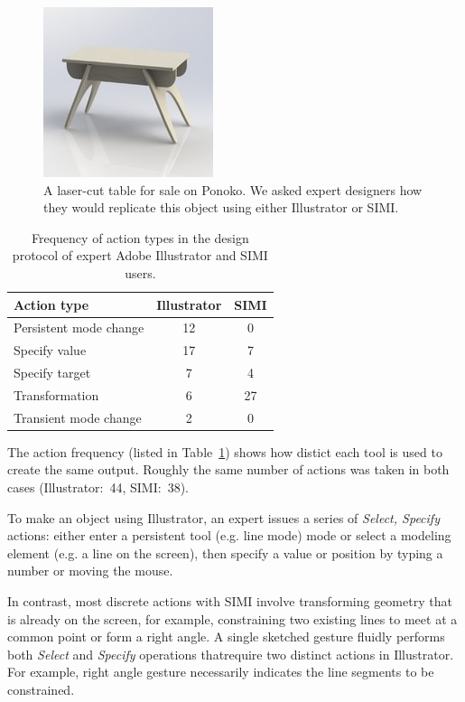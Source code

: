 \documentclass{article}
\begin{document}
\begin{figure}[h]
  \centering
  \includegraphics[width=0.4\linewidth]{img/table.jpg}
  \caption{A laser-cut table for sale on Ponoko. We asked expert
    designers how they would replicate this object using either
    Illustrator or SIMI.}
  \label{fig:table}
\end{figure}

\begin{table}[h]
\centering
\begin{tabular}{ l c c }
\textbf{Action type} & \textbf{Illustrator} & \textbf{SIMI} \\
\hline
Persistent mode change & 12 & 0 \\
Specify value & 17 & 7 \\
Specify target & 7 & 4 \\
Transformation & 6 & 27 \\
Transient mode change & 2 & 0 \\
\end{tabular}
\label{tab:expert}
\caption{Frequency of action types in the design protocol of expert
  Adobe Illustrator and SIMI users. }
\end{table}

The action frequency (listed in Table~\ref{tab:expert}) shows how
distict each tool is used to create the same output. Roughly the same
number of actions was taken in both cases (Illustrator:~44,
SIMI:~38). 

To make an object using Illustrator, an expert issues a series of
\textit{Select, Specify} actions: either enter a persistent tool
(e.g. line mode) mode or select a modeling element (e.g. a line on the
screen), then specify a value or position by typing a number or moving
the mouse.

In contrast, most discrete actions with SIMI involve transforming
geometry that is already on the screen, for example, constraining two
existing lines to meet at a common point or form a right angle. A
single sketched gesture fluidly performs both \textit{Select} and
\textit{Specify} operations thatrequire two distinct actions in
Illustrator. For example, right angle gesture necessarily indicates
the line segments to be constrained.
\end{document}
